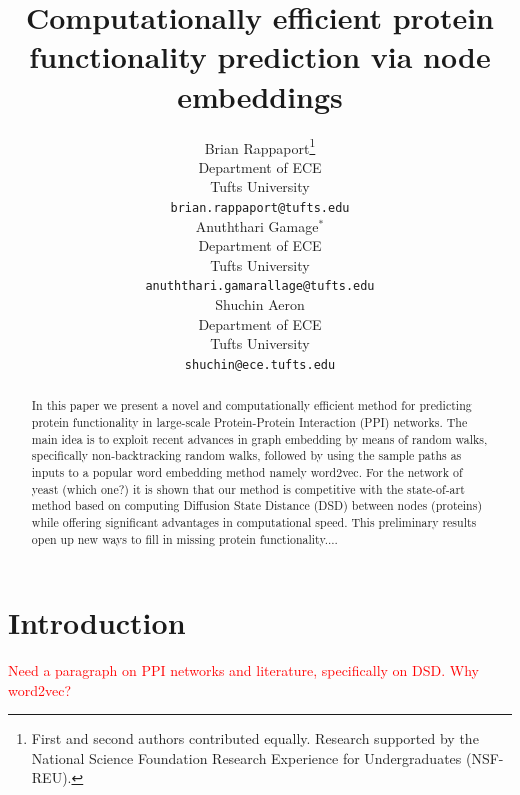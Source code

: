 \documentclass{article} %
\title{Computationally efficient protein functionality prediction via node embeddings}
\author{
Brian Rappaport\thanks{First and second authors contributed equally. Research supported by the National Science Foundation Research Experience for Undergraduates (NSF-REU).} \\
Department of ECE\\
Tufts University\\
\texttt{brian.rappaport@tufts.edu} \\
\And
Anuththari Gamage$^*$ \\
Department of ECE\\
Tufts University\\
\texttt{anuththari.gamarallage@tufts.edu} \\
\AND
Shuchin Aeron \\
Department of ECE\\
Tufts University\\
\texttt{shuchin@ece.tufts.edu} 
}
\begin{document}
\maketitle

\begin{abstract}
In this paper we present a novel and computationally efficient method for predicting protein functionality in large-scale Protein-Protein Interaction (PPI) networks. The main idea is to exploit recent advances in graph embedding by means of random walks, specifically non-backtracking random walks, followed by using the sample paths as inputs to a popular word embedding method namely word2vec. For the network of yeast (which one?) it is shown that our method is competitive with the state-of-art method based on computing Diffusion State Distance (DSD) between nodes (proteins) while offering significant advantages in computational speed. This preliminary results open up new ways to fill in missing protein functionality.... 
\end{abstract}

\section{Introduction}

\textcolor{red}{Need a paragraph on PPI networks and literature, specifically on DSD. Why word2vec? }
\end{document}

